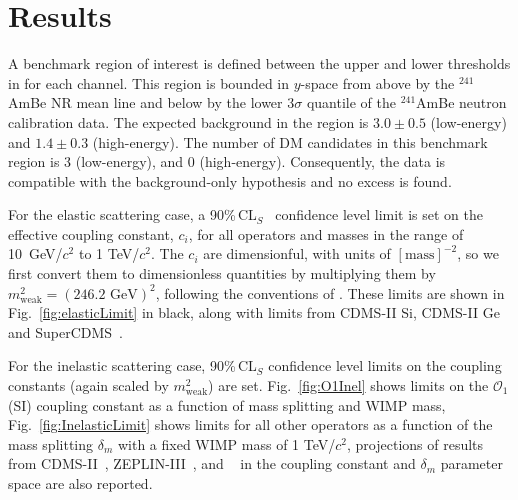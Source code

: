 \section{Results}
\label{sec:Results}

A benchmark region of interest is defined between the upper and lower thresholds in \cSi{} for each channel. This region
is bounded in $y$-space from above by the $^{241}$AmBe NR mean line and below by the lower 3$\sigma$ quantile of the $^{241}$AmBe neutron calibration data. The expected background in the region is $3.0 \pm 0.5$ (low-energy) and $1.4 \pm 0.3$ (high-energy). The number of DM candidates in this benchmark region is 3 (low-energy), and 0 (high-energy). Consequently, the data is compatible with the background-only hypothesis and no excess is found. 

For the elastic scattering case, a 90\%\,CL$_S$~\cite{cls} confidence level limit is set on the effective coupling constant, $c_i$,  for all operators and masses in the range of 10~GeV/$c^2$ to 1 TeV/$c^2$. The $c_i$ are dimensionful, with units of $[\mathrm{mass}]^{-2}$, so we first convert them to dimensionless quantities by multiplying them by $m_\mathrm{weak}^2=(246.2\text{ GeV})^2$, following the conventions of \cite{Anand:MathTools}. 
These limits are shown in Fig.~\ref{fig:elasticLimit} in black, along with limits from CDMS-II Si, CDMS-II Ge and SuperCDMS~\cite{CDMSEFT}.  


For the inelastic scattering case,  90\%\,CL$_S$ confidence level limits on the coupling constants 
(again scaled by $m_\mathrm{weak}^2$) are set. Fig.~\ref{fig:O1Inel} shows limits on the $\mathcal{O}_1$ (SI) coupling constant as a function of mass splitting and WIMP mass, Fig.~\ref{fig:InelasticLimit} shows limits for all other operators as a function of the mass splitting $\delta_m$ with a fixed WIMP mass of 1 TeV/$c^2$,  
projections of results from CDMS-II~\cite{CDMS_Inelastic}, ZEPLIN-III~\cite{Zepplin_Inel}, and \Xehund~\cite{XENON_Inelastic_WIMP} in the coupling constant and $\delta_m$ parameter space are also reported.
  

